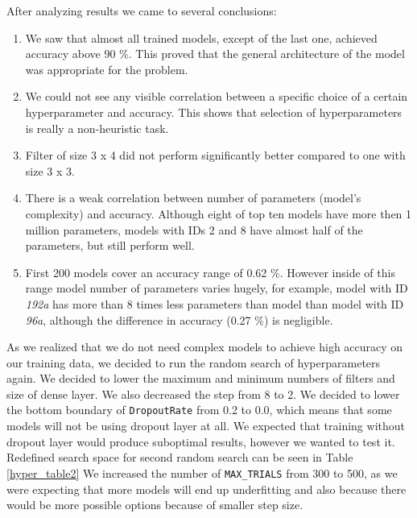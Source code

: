 After analyzing results we came to several conclusions:

\begin{enumerate}
    \item We saw that almost all trained models, except of the last one, achieved accuracy above 90 \%. This proved that the general architecture of the model was appropriate for the problem.
    \item We could not see any visible correlation between a specific choice of a certain hyperparameter and accuracy. This shows that selection of hyperparameters is really a non-heuristic task.
    \item Filter of size 3 x 4 did not perform significantly better compared to one with size 3 x 3. 
    \item There is a weak correlation between number of parameters (model's complexity) and accuracy. Although eight of top ten models have more then 1 million parameters, models with IDs 2 and 8 have almost half of the parameters, but still perform well.
    \item First 200 models cover an accuracy range of 0.62 \%. However inside of this range model number of parameters varies hugely, for example, model with ID \textit{192a} has more than 8 times less parameters than model than model with ID \textit{96a}, although the difference in accuracy (0.27 \%) is negligible.
\end{enumerate}

As we realized that we do not need complex models to achieve high accuracy on our training data, we decided to run the random search of hyperparameters again.
We decided to lower the maximum and minimum numbers of filters and size of dense layer.
We also decreased the step from 8 to 2.
We decided to lower the bottom boundary of \verb|DropoutRate| from 0.2 to 0.0, which means that some models will not be using dropout layer at all.
We expected that training without dropout layer would produce suboptimal results, however we wanted to test it.
Redefined search space for second random search can be seen in Table \ref{hyper_table2}
We increased the number of \verb|MAX_TRIALS| from 300 to 500, as we were expecting that more models will end up underfitting and also because there would be more possible options because of smaller step size.

